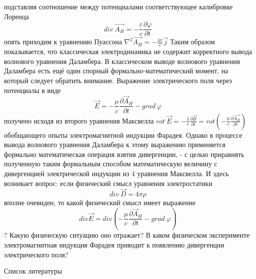 \documentclass[11pt]{article}
\begin{document}
подставляя соотношение между потенциалами соответствующее калибровке
Лоренца
\[div\ \overrightarrow{{{A}_{H}}}=-\frac{\varepsilon }{c}\frac{\partial \varphi }{\partial t}\]
опять приходим к уравнению Пуассона
\({{\nabla }^{2}}\overrightarrow{{{A}_{H}}}=-\frac{4\pi }{c}\overrightarrow{j}\)
Таким образом показывается, что классическая электродинамика не содержит
корректного вывода волнового уравнения Даламбера. В классическом выводе
волнового уравнения Даламбера есть ещё один спорный
формально-математический момент, на который следует обратить внимание.
Выражение электрического поля через потенциалы в виде
\[\overrightarrow{E}=-\frac{\mu }{c}\frac{\partial {{\overrightarrow{A}}_{H}}}{\partial t}-grad\ \varphi \]получено
исходя из второго уравнения Максвелла
\(rot\ \overrightarrow{E}=-\frac{1}{c}\frac{\partial \overrightarrow{B}}{\partial t}=rot\left( -\frac{\mu }{c}\frac{\partial \overrightarrow{{{A}_{H}}}}{\partial t} \right)\)
обобщающего опыты электромагнитной индукции Фарадея. Однако в процессе
вывода волнового уравнения Даламбера к этому выражению применяется
формально математическая операция взятия дивергенции, - с целью
приравнять полученную таким формальным способом математическую величину
с дивергенцией электрической индукции из 4 уравнения Максвелла. И здесь
возникает вопрос: если физический смысл уравнения электростатики
\[div\ \overrightarrow{D}=4\pi \rho \] вполне очевиден, то какой
физический смысл имеет выражение
\[div\overrightarrow{E}=div\left( -\frac{\mu }{c}\frac{\partial {{\overrightarrow{A}}_{H}}}{\partial t}-grad\ \varphi  \right)\]?
Какую физическую ситуацию оно отражает? В каком физическом эксперименте
электромагнитная индукция Фарадея приводит к появлению дивергенции
электрического поля?

Список литературы
\end{document}
